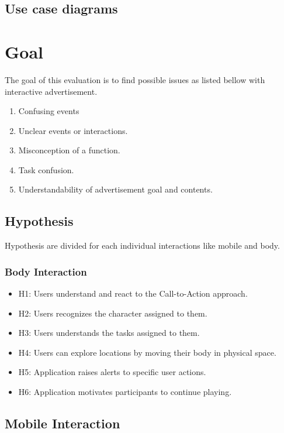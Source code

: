 \subsection{Use case diagrams}



\section{Goal}
The goal of this evaluation is to find possible issues as listed bellow with interactive advertisement. 

\begin{enumerate}
\item   Confusing events
\item   Unclear events or interactions.
\item   Misconception of a function.
\item   Task confusion.
\item   Understandability of advertisement goal and contents.
\end{enumerate}


\subsection{Hypothesis}
Hypothesis are divided for each individual interactions like mobile and body.

\subsubsection{Body Interaction}

\begin{itemize}

\item H1: Users understand and react to the Call-to-Action approach.
\item H2: Users recognizes the character assigned to them.
\item H3: Users understands the tasks assigned to them.
\item H4: Users can explore locations by moving their body in physical space.
\item H5: Application raises alerts to specific user actions.
\item H6: Application motivates participants to continue playing.
\end{itemize}

\subsection{Mobile Interaction}

